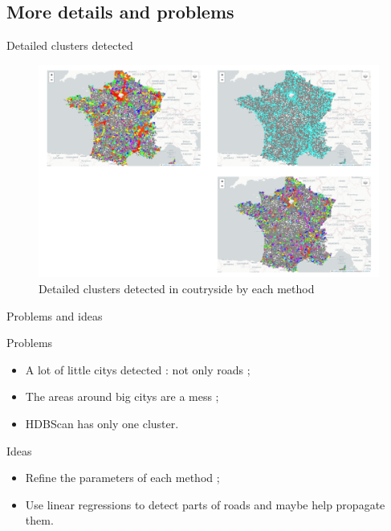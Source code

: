 \subsection{More details and problems}
\insertsubsectionframe

\begin{frame}{Detailed clusters detected}
    \begin{figure}
        \includegraphics[height=0.6\paperheight]{images/clusters_road_detection.html.png}
        \caption{Detailed clusters detected in coutryside by each method}
    \end{figure}
\end{frame}

\begin{frame}{Problems and ideas}
    \begin{block}{Problems}
        \begin{itemize}
            \item A lot of little citys detected : not only roads ;
            \item The areas around big citys are a mess ;
            \item HDBScan has only one cluster.
        \end{itemize}
    \end{block}

    \begin{block}{Ideas}
        \begin{itemize}
            \item Refine the parameters of each method ;
            \item Use linear regressions to detect parts of roads and maybe help propagate them.
        \end{itemize}
    \end{block}
\end{frame}